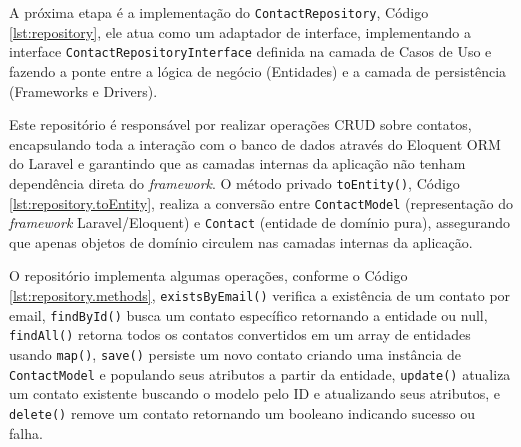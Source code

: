     \par A próxima etapa é a implementação do \texttt{ContactRepository}, Código \ref{lst:repository}, ele atua como um adaptador de interface, implementando a interface \texttt{ContactRepositoryInterface} definida na camada de Casos de Uso e fazendo a ponte entre a lógica de negócio (Entidades) e a camada de persistência (Frameworks e Drivers). 

    
    
    \par Este repositório é responsável por realizar operações CRUD sobre contatos, encapsulando toda a interação com o banco de dados através do Eloquent ORM do Laravel e garantindo que as camadas internas da aplicação não tenham dependência direta do \textit{framework}. O método privado \texttt{toEntity()}, Código \ref{lst:repository.toEntity}, realiza a conversão entre \texttt{ContactModel} (representação do \textit{framework} Laravel/Eloquent) e \texttt{Contact} (entidade de domínio pura), assegurando que apenas objetos de domínio circulem nas camadas internas da aplicação. 

    
    
    \par O repositório implementa algumas operações, conforme o Código \ref{lst:repository.methods}, \texttt{existsByEmail()} verifica a existência de um contato por email, \texttt{findById()} busca um contato específico retornando a entidade ou null, \texttt{findAll()} retorna todos os contatos convertidos em um array de entidades usando \texttt{map()}, \texttt{save()} persiste um novo contato criando uma instância de \texttt{ContactModel} e populando seus atributos a partir da entidade, \texttt{update()} atualiza um contato existente buscando o modelo pelo ID e atualizando seus atributos, e \texttt{delete()} remove um contato retornando um booleano indicando sucesso ou falha. 

    
    
